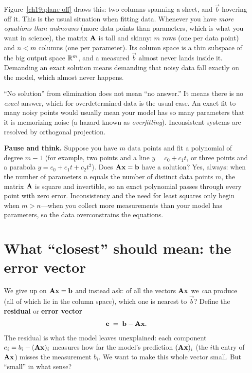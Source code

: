 Figure~\ref{ch19:plane-off} draws this: two columns spanning a sheet, and $\vec{b}$
hovering off it. This is the usual situation when fitting data. Whenever you have \emph{more
equations than unknowns} (more data points than parameters, which is what you want in science), the
matrix $\mathbf{A}$ is tall and skinny: $m$ rows (one per data point) and $n<m$ columns (one per
parameter). Its column space is a thin subspace of the big output space $\mathbb{R}^m$, and a measured
$\vec{b}$ almost never lands inside it. Demanding an exact solution means demanding that noisy data
fall exactly on the model, which almost never happens.

\begin{trapbox}
``No solution'' from elimination does not mean ``no answer.'' It means there is no \emph{exact}
answer, which for overdetermined data is the usual case. An exact fit to
many noisy points would usually mean your model has so many parameters that it is memorizing noise
(a hazard known as \emph{overfitting}). Inconsistent systems are resolved by orthogonal projection.
\end{trapbox}

\begin{recoverybox}
\textbf{Pause and think.} Suppose you have $m$ data points and fit a polynomial of degree $m-1$
(for example, two points and a line $y=c_0+c_1 t$, or three points and a parabola
$y=c_0+c_1 t+c_2 t^2$). Does $\mathbf{A}\mathbf{x}=\mathbf{b}$ have a solution?
Yes, always: when the number of parameters $n$ equals the number of distinct data points $m$, the
matrix $\mathbf{A}$ is square and invertible, so an exact polynomial passes through every point with zero
error. Inconsistency and the need for least squares only begin when $m > n$---when you collect more
measurements than your model has parameters, so the data overconstrains the equations.
\end{recoverybox}

\section{What ``closest'' should mean: the error vector}

We give up on $\mathbf{A}\mathbf{x}=\mathbf{b}$ and instead ask: of all the vectors $\mathbf{A}\mathbf{x}$ we
\emph{can} produce (all of which lie in the column space), which one is nearest to $\vec{b}$?
Define the \textbf{residual} or \textbf{error vector}
\[
  \mathbf{e} \;=\; \mathbf{b}-\mathbf{A}\mathbf{x}.
\]
The residual is what the model leaves unexplained: each component $e_i = b_i - (\mathbf{A}\mathbf{x})_i$
measures how far the model's prediction $(\mathbf{A}\mathbf{x})_i$ (the $i$th entry of $\mathbf{A}\mathbf{x}$)
misses the measurement $b_i$. We want to make this whole vector small. But ``small'' in what sense?

